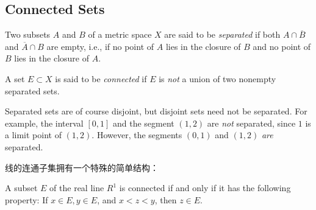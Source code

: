 \documentclass[../poma-notes.tex]{subfiles}
\begin{document}
\subsection*{Connected Sets}

\begin{definition}
  Two subsets $A$ and $B$ of a metric space $X$ are said to be \textit{separated} if both $A \cap \overline{B}$
  and $\overline{A} \cap B$ are empty, i.e., if no point of $A$ lies in the closure of $B$ and no point of $B$
  lies in the closure of $A$.

  A set $E \subset X$ is said to be \textit{connected} if $E$ is \textit{not} a union of two nonempty separated
  sets.
\end{definition}

\anote

\begin{remark}
  Separated sets are of course disjoint, but disjoint sets need not be separated. For example, the interval $[0,1]$
  and the segment $(1,2)$ are \textit{not} separated, since $1$ is a limit point of $(1,2)$. However, the segments
  $(0,1)$ and $(1,2)$ \textit{are} separated.
\end{remark}

\anote

线的连通子集拥有一个特殊的简单结构：

\begin{theorem}
  A subset $E$ of the real line $R^1$ is connected if and only if it has the following property: If $x\in E, y\in E$,
  and $x<z<y$, then $z\in E$.
\end{theorem}
\end{document}
